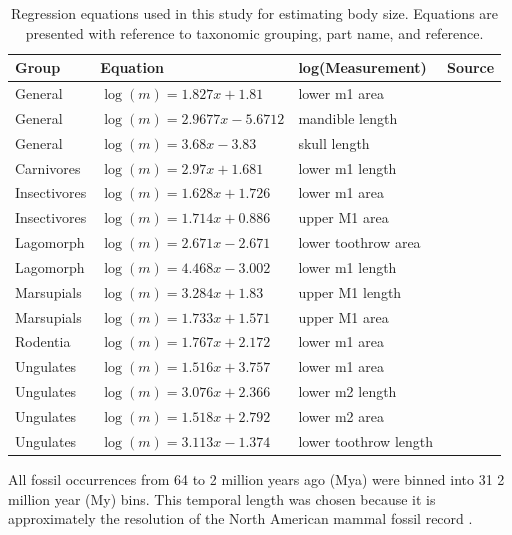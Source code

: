 \documentclass[12pt,letterpaper]{article}
\begin{document}
\begin{table}[ht]
  \centering
  \caption{Regression equations used in this study for estimating body size. Equations are presented with reference to taxonomic grouping, part name, and reference.}
  \begin{tabular}{l | l | l | l}
    Group & Equation & log(Measurement) & Source \\
    \hline
    General & \(\log(m) = 1.827x + 1.81\) & lower m1 area &  \cite{Legendre1986} \\
    General & \(\log(m) = 2.9677x - 5.6712\) & mandible length & \cite{Foster2009a} \\
    General & \(\log(m) = 3.68x - 3.83\) & skull length & \cite{Luo2001} \\
    Carnivores & \(\log(m) = 2.97x + 1.681\) & lower m1 length & \cite{VanValkenburgh1990} \\
    Insectivores & \(\log(m) = 1.628x + 1.726\) & lower m1 area & \cite{Bloch1998} \\
    Insectivores & \(\log(m) = 1.714x + 0.886\) & upper M1 area & \cite{Bloch1998} \\
    Lagomorph & \(\log(m) = 2.671x - 2.671\) & lower toothrow area & \cite{Tomiya2013} \\
    Lagomorph & \(\log(m) = 4.468x - 3.002\) & lower m1 length & \cite{Tomiya2013} \\
    Marsupials & \(\log(m) = 3.284x + 1.83\) & upper M1 length & \cite{Gordon2003} \\
    Marsupials & \(\log(m) = 1.733x + 1.571\) & upper M1 area & \cite{Gordon2003} \\
    Rodentia & \(\log(m) = 1.767x + 2.172\) & lower m1 area & \cite{Legendre1986} \\
    Ungulates & \(\log(m) = 1.516x + 3.757\) & lower m1 area & \cite{Mendoza2006} \\
    Ungulates & \(\log(m) = 3.076x + 2.366\) & lower m2 length & \cite{Mendoza2006} \\
    Ungulates & \(\log(m) = 1.518x + 2.792\) & lower m2 area & \cite{Mendoza2006} \\
    Ungulates & \(\log(m) = 3.113x - 1.374\) & lower toothrow length & \cite{Mendoza2006} \\
    \hline
  \end{tabular}
  \label{tab:mass_est}
\end{table}


All fossil occurrences from 64 to 2 million years ago (Mya) were binned into 31 2 million year (My) bins. This temporal length was chosen because it is approximately the resolution of the North American mammal fossil record \citep{Alroy1996a,Alroy2000g,Marcot2014}.
\end{document}
